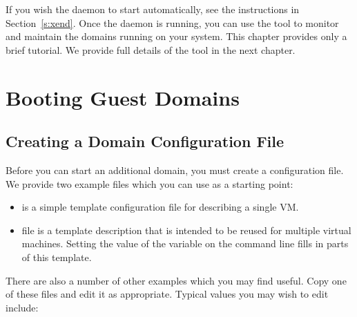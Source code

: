 \documentclass[11pt,twoside,final,openright]{report}
\begin{document}
If you wish the daemon to start automatically, see the instructions in
Section~\ref{s:xend}. Once the daemon is running, you can use the
 tool to monitor and maintain the domains running on your
system. This chapter provides only a brief tutorial. We provide full
details of the  tool in the next chapter.

%
%
%
\section{Booting Guest Domains}

\subsection{Creating a Domain Configuration File}

Before you can start an additional domain, you must create a
configuration file. We provide two example files which you can use as
a starting point:
\begin{itemize}
\item {} is a simple template configuration
  file for describing a single VM\@.
\item {} file is a template description that
  is intended to be reused for multiple virtual machines.  Setting the
  value of the  variable on the  command line
  fills in parts of this template.
\end{itemize}

There are also a number of other examples which you may find useful.
Copy one of these files and edit it as appropriate.  Typical values
you may wish to edit include:
\end{document}

